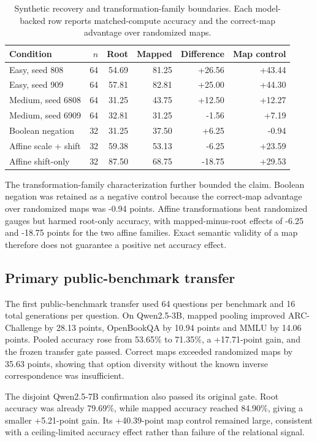 \documentclass[11pt]{article}
\begin{document}
\begin{table}[H]
\centering\small
\caption{Synthetic recovery and transformation-family boundaries. Each model-backed row reports matched-compute accuracy and the correct-map advantage over randomized maps.}
\label{tab:synthetic}
\begin{tabular}{lrrrrr}
\toprule
Condition & $n$ & Root & Mapped & Difference & Map control \\
\midrule
Easy, seed 808 & 64 & 54.69 & 81.25 & +26.56 & +43.44 \\
Easy, seed 909 & 64 & 57.81 & 82.81 & +25.00 & +44.30 \\
Medium, seed 6808 & 64 & 31.25 & 43.75 & +12.50 & +12.27 \\
Medium, seed 6909 & 64 & 32.81 & 31.25 & -1.56 & +7.19 \\
Boolean negation & 32 & 31.25 & 37.50 & +6.25 & -0.94 \\
Affine scale + shift & 32 & 59.38 & 53.13 & -6.25 & +23.59 \\
Affine shift-only & 32 & 87.50 & 68.75 & -18.75 & +29.53 \\
\bottomrule
\end{tabular}
\end{table}

The transformation-family characterization further bounded the claim. Boolean negation was retained as a negative control because the correct-map advantage over randomized maps was -0.94 points. Affine transformations beat randomized gauges but harmed root-only accuracy, with mapped-minus-root effects of -6.25 and -18.75 points for the two affine families. Exact semantic validity of a map therefore does not guarantee a positive net accuracy effect.

\subsection{Primary public-benchmark transfer}

The first public-benchmark transfer used 64 questions per benchmark and 16 total generations per question. On Qwen2.5-3B, mapped pooling improved ARC-Challenge by 28.13 points, OpenBookQA by 10.94 points and MMLU by 14.06 points. Pooled accuracy rose from 53.65\% to 71.35\%, a +17.71-point gain, and the frozen transfer gate passed. Correct maps exceeded randomized maps by 35.63 points, showing that option diversity without the known inverse correspondence was insufficient.

The disjoint Qwen2.5-7B confirmation also passed its original gate. Root accuracy was already 79.69\%, while mapped accuracy reached 84.90\%, giving a smaller +5.21-point gain. Its +40.39-point map control remained large, consistent with a ceiling-limited accuracy effect rather than failure of the relational signal.
\end{document}
